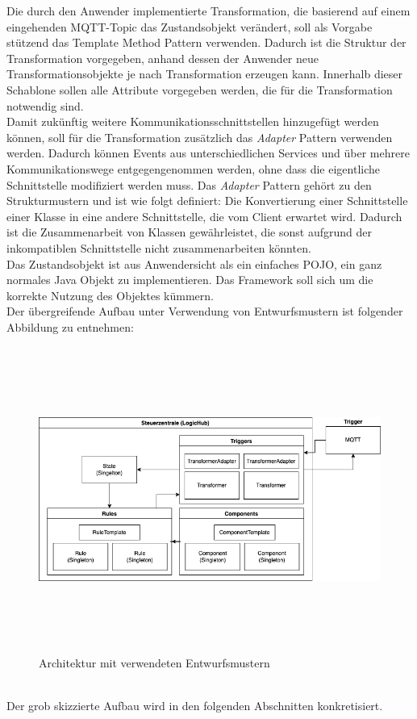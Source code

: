         \linebreak
        Die durch den Anwender implementierte Transformation, die basierend auf einem eingehenden \acs{MQTT}-Topic das Zustandsobjekt verändert, soll als Vorgabe 
        stützend das {Template Method} Pattern verwenden. Dadurch ist die Struktur der Transformation vorgegeben, anhand dessen der Anwender neue Transformationsobjekte 
        je nach Transformation erzeugen kann. Innerhalb dieser Schablone sollen alle Attribute vorgegeben werden, die für die Transformation notwendig sind.
        \\
        \linebreak
        Damit zukünftig weitere Kommunikationsschnittstellen hinzugefügt werden können, soll für die Transformation zusätzlich das 
        \textit{Adapter} Pattern verwenden werden. Dadurch können Events aus unterschiedlichen Services und über mehrere Kommunikationswege 
        entgegengenommen werden, ohne dass die eigentliche Schnittstelle modifiziert werden muss. Das \textit{Adapter} Pattern gehört 
        zu den Strukturmustern und ist wie folgt definiert: 
        Die Konvertierung einer Schnittstelle einer Klasse in eine andere Schnittstelle, die vom Client erwartet wird. Dadurch ist die Zusammenarbeit von Klassen 
        gewährleistet, die sonst aufgrund der inkompatiblen Schnittstelle nicht zusammenarbeiten könnten. \cite{gamma1995adapter}
        \\
        Das Zustandsobjekt ist aus Anwendersicht als ein einfaches \ac{POJO}, ein ganz normales Java Objekt zu implementieren. Das Framework soll sich um die korrekte Nutzung 
        des Objektes kümmern. 
        \\
        \linebreak
        Der übergreifende Aufbau unter Verwendung von Entwurfsmustern ist folgender Abbildung zu entnehmen:
        \begin{figure}[hbt!]
            \centering
            \includegraphics[width=14cm,height=10cm,keepaspectratio]{images/final_architecture_with_patterns.png}
            \caption{Architektur mit verwendeten Entwurfsmustern}
            \label{fig:patternarchitektur}
        \end{figure}
        \\
        Der grob skizzierte Aufbau wird in den folgenden Abschnitten konkretisiert.

